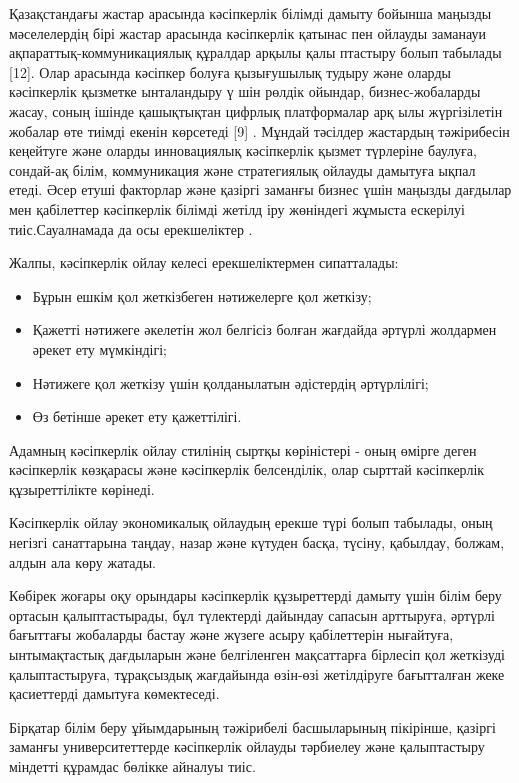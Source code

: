 \begin{multicols}{2}
Қазақстандағы жастар арасында кәсіпкерлік білімді дамыту бойынша маңызды
мәселелердің бірі жастар арасында кәсіпкерлік қатынас пен ойлауды
заманауи ақпараттық-коммуникациялық құралдар арқылы қалы птастыру болып
табылады {[}12{]}. Олар арасында кәсіпкер болуға қызығушылық тудыру және
оларды кәсіпкерлік қызметке ынталандыру ү шін рөлдік ойындар,
бизнес-жобаларды жасау, соның ішінде қашықтықтан цифрлық платформалар
арқ ылы жүргізілетін жобалар өте тиімді екенін көрсетеді {[}9{]} .
Мұндай тәсілдер жастардың тәжірибесін кеңейтуге және оларды инновациялық
кәсіпкерлік қызмет түрлеріне баулуға, сондай-ақ білім, коммуникация және
стратегиялық ойлауды дамытуға ықпал етеді. Әсер етуші факторлар және
қазіргі заманғы бизнес үшін маңызды дағдылар мен қабілеттер кәсіпкерлік
білімді жетілд іру жөніндегі жұмыста ескерілуі тиіс.Сауалнамада да осы
ерекшеліктер .

Жалпы, кәсіпкерлік ойлау келесі ерекшеліктермен сипатталады:

\begin{itemize}
\item
  Бұрын ешкім қол жеткізбеген нәтижелерге қол жеткізу;
\item
  Қажетті нәтижеге әкелетін жол белгісіз болған жағдайда әртүрлі
  жолдармен әрекет ету мүмкіндігі;
\item
  Нәтижеге қол жеткізу үшін қолданылатын әдістердің әртүрлілігі;
\item
  Өз бетінше әрекет ету қажеттілігі.
\end{itemize}

Адамның кәсіпкерлік ойлау стилінің сыртқы көріністері - оның өмірге
деген кәсіпкерлік көзқарасы және кәсіпкерлік белсенділік, олар сырттай
кәсіпкерлік құзыреттілікте көрінеді.

Кәсіпкерлік ойлау экономикалық ойлаудың ерекше түрі болып табылады, оның
негізгі санаттарына таңдау, назар және күтуден басқа, түсіну, қабылдау,
болжам, алдын ала көру жатады.

Көбірек жоғары оқу орындары кәсіпкерлік құзыреттерді дамыту үшін білім
беру ортасын қалыптастырады, бұл түлектерді дайындау сапасын арттыруға,
әртүрлі бағыттағы жобаларды бастау және жүзеге асыру қабілеттерін
нығайтуға, ынтымақтастық дағдыларын және белгіленген мақсаттарға
бірлесіп қол жеткізуді қалыптастыруға, тұрақсыздық жағдайында өзін-өзі
жетілдіруге бағытталған жеке қасиеттерді дамытуға көмектеседі.

Бірқатар білім беру ұйымдарының тәжірибелі басшыларының пікірінше,
қазіргі заманғы университеттерде кәсіпкерлік ойлауды тәрбиелеу және
қалыптастыру міндетті құрамдас бөлікке айналуы тиіс.


\end{multicols}
